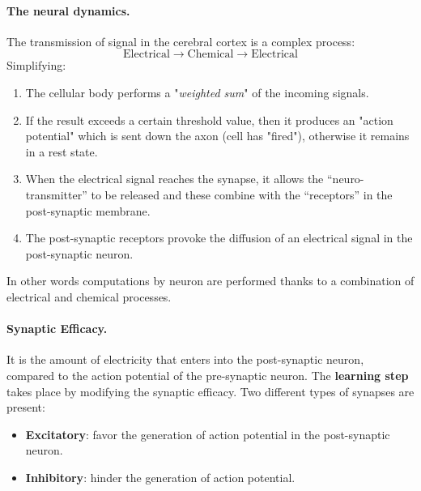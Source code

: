 \paragraph*{The neural dynamics.} The transmission of signal in the cerebral cortex is a complex process:
$$\text{Electrical} \rightarrow \text{Chemical} \rightarrow \text{Electrical}$$
Simplifying:
\begin{enumerate}
	\item The cellular body performs a "\textit{weighted sum}" of the incoming signals.
	\item If the result exceeds a certain threshold value, then it produces an "action potential" which is sent down the axon (cell has "fired"), otherwise it remains in a rest state.
	\item When the electrical signal reaches the synapse, it allows the “neuro-transmitter” to be released and these combine with the “receptors” in the post-synaptic membrane.
	\item The post-synaptic receptors provoke the diffusion of an electrical signal in the post-synaptic neuron. 
\end{enumerate}
In other words computations by neuron are performed thanks to a combination of electrical and chemical processes. 

\paragraph*{Synaptic Efficacy.} It is the amount of electricity that enters into the post-synaptic neuron, compared to the action potential of the pre-synaptic neuron. The \textbf{learning step} takes place by modifying the synaptic efficacy. Two different types of synapses are present:
\begin{itemize}
	\item \textbf{Excitatory}: favor the generation of action potential in the post-synaptic neuron.
	\item \textbf{Inhibitory}: hinder the generation of action potential.
\end{itemize}

